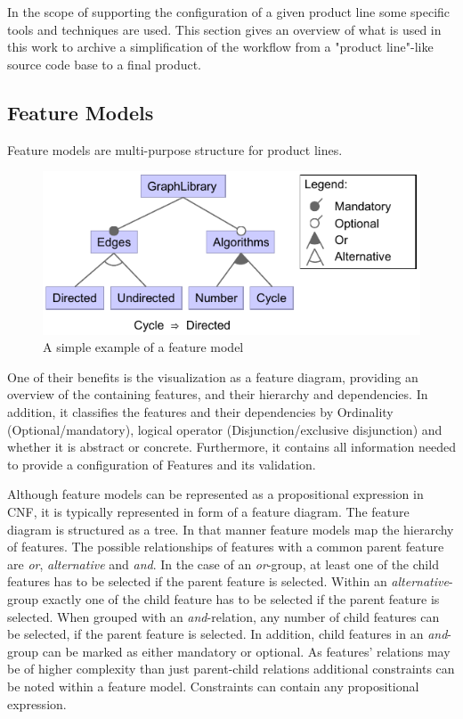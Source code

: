 In the scope of supporting the configuration of a given product line some specific tools and techniques are used. This section gives an overview of what is used in this work to archive a simplification of the workflow from a "product line"-like source code base to a final product.

\subsection{Feature Models} \label{ch:fm}
Feature models are multi-purpose structure for product lines. 
\begin{figure}
	\includegraphics{img/img-fm.pdf}
	\caption{A simple example of a feature model}
	\label{img-fm}
\end{figure}
One of their benefits is the visualization as a feature diagram, providing an overview of the containing features, and their hierarchy and dependencies. In addition, it classifies the features and their dependencies by Ordinality (Optional/mandatory), logical operator (Disjunction/exclusive disjunction) and whether it is abstract or concrete. Furthermore, it contains all information needed to provide a configuration of Features and its validation.

Although feature models can be represented as a propositional expression in CNF, it is typically represented in form of a feature diagram. The feature diagram is structured as a tree. In that manner feature models map the hierarchy of features. The possible relationships of features with a common parent feature are \textit{or}, \textit{alternative} and \textit{and}. In the case of an \textit{or}-group, at least one of the child features has to be selected if the parent feature is selected. Within an \textit{alternative}-group exactly one of the child feature has to be selected if the parent feature is selected. When grouped with an \textit{and}-relation, any number of child features can be selected, if the parent feature is selected. In addition, child features in an \textit{and}-group can be marked as either mandatory or optional.  As features' relations may be of higher complexity than just parent-child relations additional constraints can be noted within a feature model. Constraints can contain any propositional expression.

